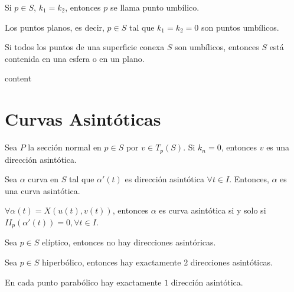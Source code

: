 \begin{defn}
  Si $p \in S$, $k_{1} = k_{2}$, entonces $p$ se llama punto umbílico.
\end{defn}

\begin{obs}
  Los puntos planos, es decir, $p \in S$ tal que $k_{1} = k_{2} = 0$ son puntos umbílicos.
\end{obs}

\begin{prop}
  Si todos los puntos de una superficie conexa $S$ son umbílicos, entonces $S$ está contenida en una esfera o en un plano.
\end{prop}

\begin{dem}
  content
\end{dem}

\section{Curvas Asintóticas}

\begin{defn}
  Sea $P$ la sección normal en $p \in S$ por $v \in T_{p}(S)$. Si $k_{n} = 0$, entonces $v$ es una dirección asintótica.
\end{defn}

\begin{defn}
  Sea $\alpha$ curva en $S$ tal que $\alpha'(t)$ es dirección asintótica $\forall t \in I$. Entonces, $\alpha$ es una curva asintótica. 
\end{defn}

\begin{obs}
  $\forall \alpha(t) = X(u(t),v(t))$, entonces $\alpha$ es curva asintótica si y solo si $II_{p}(\alpha'(t)) = 0, \forall t \in I$.
\end{obs}

\begin{lem}
  Sea $p \in S$ elíptico, entonces no hay direcciones asintóricas.
\end{lem}

\begin{lem}
  Sea $p \in S$ hiperbólico, entonces hay exactamente $2$ direcciones asintóticas.
\end{lem}

\begin{obs}
  En cada punto parabólico hay exactamente $1$ dirección asintótica.
\end{obs}

